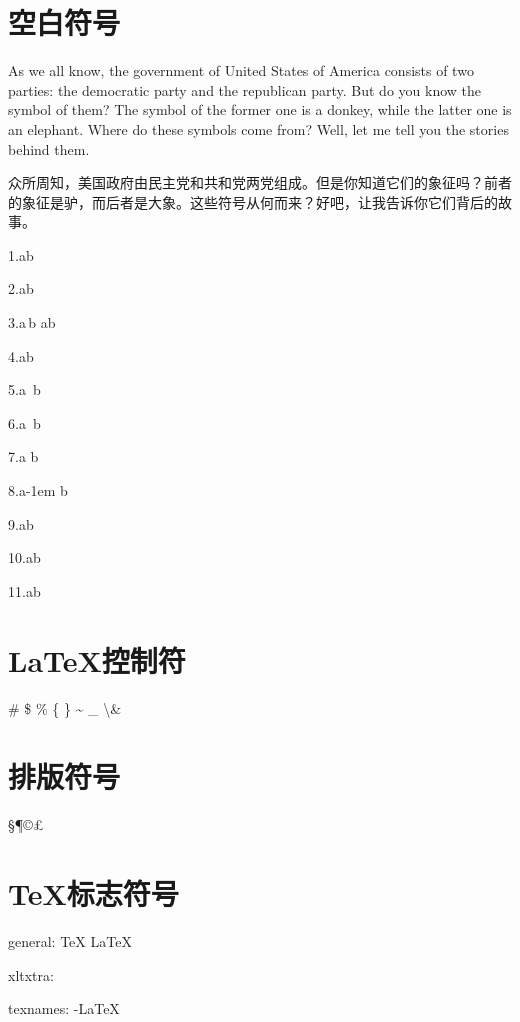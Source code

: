 \documentclass{article}
\begin{document}
	\section{空白符号}
	As we all know, the government of United States of America consists of two parties: the democratic party and the republican party. But do you know the symbol of them? The symbol of the former one is a donkey, while the latter one is an elephant. Where do these symbols come from? Well, let me tell you the stories behind them.
	
	众所周知，美国政府由民主党和共和党两党组成。但是你知道它们的象征吗？前者的象征是驴，而后者是大象。这些符号从何而来？好吧，让我告诉你它们背后的故事。
	
	1.a\quad b
	
	2.a\qquad b
	
	3.a\,b a\thinspace b
	
	4.a\enspace b
	
	5.a\ b
	
	6.a~b
	
	7.a\kern 1pc b
	
	8.a\kern -1em b
	
	9.a\hspace{35pt}b
	
	10.a\hphantom{xyz}b
	
	11.a\hfill b
	\section{\LaTeX 控制符}
	\# \$ \% \{ \} \~{} \_{} \textbackslash \&
	\section{排版符号}
	\S \P \dag \ddag \copyright \pounds
	\section{\TeX 标志符号}
	general: \TeX{}	\LaTeX{}	\LaTeXe{}
	
	xltxtra: \XeLaTeX
	
	texnames: \AmSTeX{}	\AmS-\LaTeX{}
	\BibTeX{}	\LuaTeX{}
	
\end{document}
